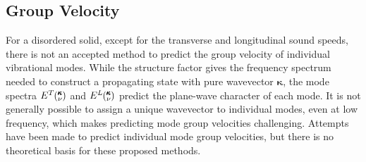 \documentclass[aps,prb,twocolumn,superscriptaddress,footinbib,amsmath,amssymb,floatfix]{revtex4}
\newcommand{\kv}{\mspace{-4.0mu}\left(\mspace{-8.0mu}
\begin{smallmatrix}&\pmb{\kappa} \\&\nu\end{smallmatrix}
\mspace{-3.0mu}\right)}
\begin{document}
\clearpage

\subsection{\label{S:Vg}Group Velocity}

For a disordered solid, 
except for the transverse and longitudinal sound speeds, there is not an 
accepted method to predict the group velocity of individual  
vibrational modes. 
While the structure factor gives the frequency spectrum needed to 
construct a propagating state with pure wavevector $\pmb{\kappa}$, 
the mode spectra $E^{T}\kv$ and $E^{L}\kv$ predict the 
plane-wave character of each mode.
\cite{biswas_vibrational_1988,allen_diffusons_1999} 
It is not generally possible 
to assign a unique wavevector to individual modes, even at low frequency,
\cite{biswas_vibrational_1988,allen_diffusons_1999} 
which makes predicting mode group velocities challenging. 
Attempts have been made to predict individual mode group velocities,
\cite{duda_reducing_2011,donadio_atomistic_2009,
he_heat_2011,he_thermal_2011-3,he_morphology_2011,hori_phonon_2013} 
but there is no theoretical basis for these proposed methods. 
\end{document}

